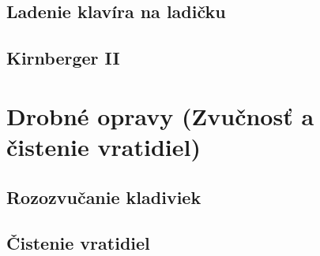 \subsection{Ladenie klavíra na ladičku}

\subsection{Kirnberger II}

\section{Drobné opravy (Zvučnosť a čistenie vratidiel)}

\subsection{Rozozvučanie kladiviek}

\subsection{Čistenie vratidiel}

